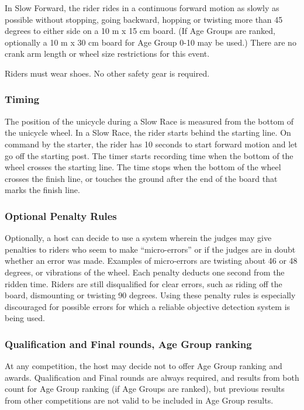 In Slow Forward, the rider rides in a continuous forward motion as slowly as possible without stopping, going backward, hopping or twisting more than 45 degrees to either side on a 10 m x 15 cm board.
(If Age Groups are ranked, optionally a 10 m x 30 cm board for Age Group 0-10 may be used.)
There are no crank arm length or wheel size restrictions for this event.

Riders must wear shoes.
No other safety gear is required.

\subsubsection{Timing}
The position of the unicycle during a Slow Race is measured from the bottom of the unicycle wheel.
In a Slow Race, the rider starts behind the starting line.
On command by the starter, the rider has 10 seconds to start forward motion and let go off the starting post.
The timer starts recording time when the bottom of the wheel crosses the starting line.
The time stops when the bottom of the wheel crosses the finish line, or touches the ground after the end of the board that marks the finish line.


\subsubsection{Optional Penalty Rules}
Optionally, a host can decide to use a system wherein the judges may give penalties to riders who seem to make ``micro-errors'' or if the judges are in doubt whether an error was made.
Examples of micro-errors are twisting about 46 or 48 degrees, or vibrations of the wheel.
Each penalty deducts one second from the ridden time.
Riders are still disqualified for clear errors, such as riding off the board, dismounting or twisting 90 degrees.
Using these penalty rules is especially discouraged for possible errors for which a reliable objective detection system is being used.

\subsubsection{Qualification and Final rounds, Age Group ranking}
At any competition, the host may decide not to offer Age Group ranking and awards.
Qualification and Final rounds are always required, and results from both count for Age Group ranking (if Age Groups are ranked), but previous results from other competitions are not valid to be included in Age Group results.

